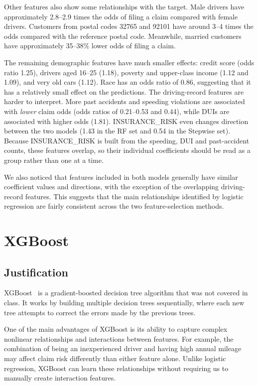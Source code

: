 \documentclass[conference]{IEEEtran}
\begin{document}
Other features also show some relationships with the target. Male drivers have approximately 2.8--2.9 times
the odds of filing a claim compared with female drivers. Customers from postal codes 32765 and 92101 have
around 3--4 times the odds compared with the reference postal code. Meanwhile, married customers have
approximately 35--38\% lower odds of filing a claim.

The remaining demographic features have much smaller effects: credit score (odds ratio 1.25), drivers aged
16--25 (1.18), poverty and upper-class income (1.12 and 1.09), and very old cars (1.12). Race has an odds
ratio of 0.86, suggesting that it has a relatively small effect on the predictions. The driving-record
features are harder to interpret. More past accidents and speeding violations are associated with
\emph{lower} claim odds (odds ratios of 0.21--0.53 and 0.44), while DUIs are associated with higher odds
(1.81). INSURANCE\_RISK even changes direction between the two models (1.43 in the RF set and 0.54 in the
Stepwise set). Because INSURANCE\_RISK is built from the speeding, DUI and past-accident counts, these
features overlap, so their individual coefficients should be read as a group rather than one at a time.

We also noticed that features included in both models generally have similar coefficient values and
directions, with the exception of the overlapping driving-record features. This suggests that the main
relationships identified by logistic regression are fairly consistent across the two feature-selection
methods.

\section{XGBoost}

\subsection{Justification}

XGBoost~\cite{chen2016xgboost} is a gradient-boosted decision tree algorithm that was not covered in class.
It works by building multiple decision trees sequentially, where each new tree attempts to correct the
errors made by the previous trees.

One of the main advantages of XGBoost is its ability to capture complex nonlinear relationships and
interactions between features. For example, the combination of being an inexperienced driver and having
high annual mileage may affect claim risk differently than either feature alone. Unlike logistic regression,
XGBoost can learn these relationships without requiring us to manually create interaction features.
\end{document}
